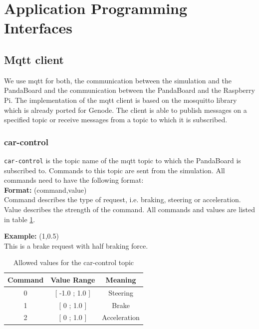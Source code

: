 \newpage
\section{Application Programming Interfaces}
\label{sec:api}

\subsection{Mqtt client}
We use mqtt for both, the communication between the simulation and the PandaBoard and the communication between the PandaBoard and the Raspberry Pi. The implementation of the mqtt client is based on the mosquitto library which is already ported for Genode. The client is able to publish messages on a specified topic or receive messages from a topic to which it is subscribed. 

\subsubsection{car-control}
\label{sec:mqtt-car-control}
\texttt{car-control} is the topic name of the mqtt topic to which the PandaBoard is subscribed to. Commands to this topic are sent from the simulation. All commands need to have the following format: \\

\textbf{Format:} (command,value) \\
Command describes the type of request, i.e. braking, steering or acceleration. Value describes the strength of the command. All commands and values are listed in table \ref{tab:car-control}.

\textbf{Example:} (1,0.5) \\
This is a brake request with half braking force.

\begin{table}[h]
    \centering
    \begin{tabular}{c | c | c}
        \textbf{Command} & \textbf{Value Range} & \textbf{Meaning} \\ \hline
        0   &   [ -1.0 ; 1.0 ]    & Steering \\
        1   &   [ 0 ; 1.0 ]       & Brake \\ 
        2   &   [ 0 ; 1.0 ]       & Acceleration \\ 
    \end{tabular}
    \caption{Allowed values for the car-control topic}
    \label{tab:car-control}
\end{table}


